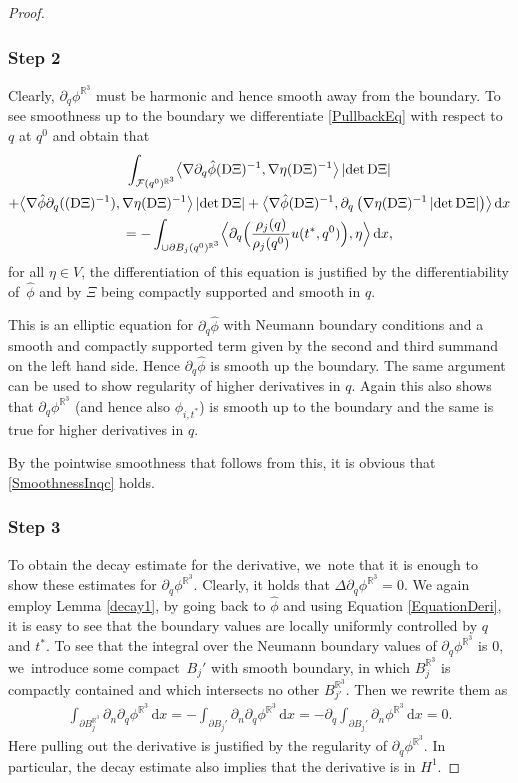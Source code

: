 \documentclass[10pt]{amsart}
\theoremstyle{definition}
\newcommand\R{\mathbb{R}}
\newcommand\bscalar[2]{\bigl\langle #1,#2\bigr\rangle}
\newcommand\Bscalar[2]{\Bigl\langle #1,#2\Bigr\rangle}
\newcommand\eq{=}
\newcommand\dd{\,\mathrm{d}}
\newcommand\dx{\dd x}
\let\de\partial
\begin{document}
\begin{proof}
\subsubsection*{Step 2} Clearly, $\de_q \phi^{\R^3}$ must be harmonic and hence smooth away from the boundary. To see smoothness up to the boundary we differentiate \eqref{PullbackEq} with respect to $q$ at $q^0$ and obtain that
\begin{multline}
\int_{\mathcal{F}(q^0)^{\R^3}}\bscalar{\nabla\de_q\hat{\phi}(\text{D}\Xi)^{-1}}{\nabla\eta(\text{D}\Xi)^{-1}}\,|{\det \mathrm{D}\Xi}|\\
+\bscalar{\nabla\hat{\phi}\de_q((\text{D}\Xi)^{-1})}{\nabla\eta(\text{D}\Xi)^{-1}}\,|{\det \text{D}\Xi}|
+ \bscalar{\nabla\hat{\phi}(\text{D}\Xi)^{-1}}{\de_q\left(\nabla\eta(\text{D}\Xi)^{-1}\,|{\det \text{D}\Xi}|\right)}\dx\label{EquationDeri}\\
\eq-\int_{\cup \de B_j(q^0)^{\R^3} }\Bscalar{\de_q\Bigl(\frac{\rho_j(q)}{\rho_j(q^0)}u(t^*,q^0)\Bigr)}{\eta}\dx,
\end{multline}
for all $\eta\in V$, the differentiation of this equation is justified by the differentiability of~$\hat{\phi}$ and by $\Xi$ being compactly supported and smooth in $q$.

This is an elliptic equation for $\de_q\hat{\phi}$ with Neumann boundary conditions and a smooth and compactly supported term given by the second and third summand on the left hand side. Hence $\de_q\hat{\phi}$ is smooth up the boundary. The same argument can be used to show regularity of higher derivatives in $q$. Again this also shows that $\de_q\phi^{\R^3}$ (and hence also $\phi_{i,t^*}$) is smooth up to the boundary and the same is true for higher derivatives in $q$.

By the pointwise smoothness that follows from this, it is obvious that \eqref{SmoothnessInqc} holds.

\subsubsection*{Step 3} To obtain the decay estimate for the derivative, we~note that it is enough to show these estimates for $\de_q\phi^{\R^3}$. Clearly, it holds that $\Delta\de_q\phi^{\R^3}=0$.
We again employ Lemma \ref{decay1}, by \eg going back to $\hat{\phi}$ and using Equation \eqref{EquationDeri}, it is easy to see that the boundary values are locally uniformly controlled by $q$ and $t^*$. To see that the integral over the Neumann boundary values of $\de_q\phi^{\R^3}$ is $0$, we~introduce some compact~$B_j'$ with smooth boundary, in which $B_j^{\R^3}$ is compactly contained and which intersects no other $B_{j'}^{\R^3}$. Then we rewrite them as
\begin{align*}
\int_{\de B_j^{\R^3}}\de_n\de_q\phi^{\R^3}\dx\eq -\int_{\de B_j'}\de_n\de_q\phi^{\R^3}\dx\eq-\de_q\int_{\de B_j'}\de_n\phi^{\R^3}\dx\eq0.
\end{align*}
Here pulling out the derivative is justified by the regularity of $\de_q\phi^{\R^3}$.
In particular, the decay estimate also implies that the derivative is in $H^1$.
\end{proof}
\end{document}
